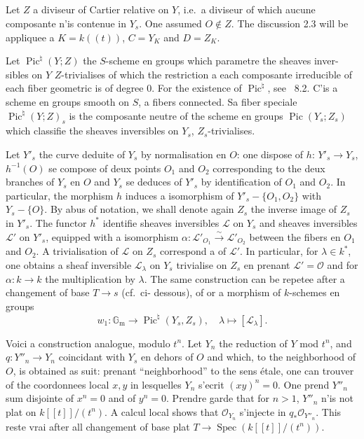 \documentclass[12pt,a4paper]{article}
\theoremstyle{plain}
\theoremstyle{definition}
\theoremstyle{remark}
\DeclareMathOperator{\Spec}{Spec}
\DeclareMathOperator{\Pic}{Pic}
\newcommand{\OO}{\mathcal{O}}
\newcommand{\Gm}{\mathbb{G}_{\mathrm{m}}}
\providecommand{\Gm}{\mathbb{G}_{\mathrm m}}
\providecommand{\Spec}{\operatorname{Spec}}
\begin{document}
\subsection{}

Let $Z$ a diviseur of Cartier relative on $Y$, i.e.\ a diviseur of which aucune
composante n'is contenue in $Y_s$. One assumed $O\notin Z$. The discussion 2.3
will be appliquee a $K=k((t))$, $C=Y_K$ and $D=Z_K$.

Let $\Pic^\natural(Y;Z)$ the $S$-scheme en groups which parametre the sheaves inver-
sibles on $Y$ $Z$-trivialises of which the restriction a each composante irreducible
of each fiber geometric is of degree $0$. For the existence of $\Pic^\natural$, see
\cite{Raynaud1}~8.2. C'is a scheme en groups smooth on $S$, a fibers connected.
Sa fiber speciale $\Pic^\natural(Y;Z)_s$ is the composante neutre of the scheme en groups
$\Pic(Y_s;Z_s)$ which classifie the sheaves inversibles on $Y_s$, $Z_s$-trivialises.

Let $Y'_s$ the curve deduite of $Y_s$ by normalisation en $O$: one dispose of $h$:
$Y'_s\to Y_s$, $h^{-1}(O)$ se compose of deux points $O_1$ and $O_2$ corresponding to the deux
branches of $Y_s$ en $O$ and $Y_s$ se deduces of $Y'_s$ by identification of $O_1$ and $O_2$.
In particular, the morphism $h$ induces a isomorphism of $Y'_s-\{O_1,O_2\}$ with
$Y_s-\{O\}$. By abus of notation, we shall denote again $Z_s$ the inverse image of $Z_s$
in $Y'_s$. The functor $h^*$ identifie sheaves inversibles $\mathscr{L}$ on $Y_s$ and sheaves
inversibles $\mathscr{L}'$ on $Y'_s$, equipped with a isomorphism
$\alpha:\mathscr{L}'_{O_1}\xrightarrow{\sim}\mathscr{L}'_{O_2}$ between the fibers en $O_1$ and $O_2$.
A trivialisation of $\mathscr{L}$ on $Z_s$ correspond a of $\mathscr{L}'$. In particular, for
$\lambda\in k^*$, one obtains a sheaf inversible $\mathscr{L}_\lambda$ on $Y_s$ trivialise on $Z_s$ en
prenant $\mathscr{L}'=\OO$ and for $\alpha:k\to k$ the multiplication by $\lambda$. The same
construction can be repetee after a changement of base $T\to s$ (cf.\ ci-
dessous), of or a morphism of $k$-schemes en groups
\begin{equation}\label{eq:2.4.1}
w_1:\Gm\to\Pic^\natural(Y_s,Z_s),\quad\lambda\mapsto[\mathscr{L}_\lambda].
\end{equation}

Voici a construction analogue, modulo $t^n$. Let $Y_n$ the reduction of $Y$ mod $t^n$,
and $q:Y''_n\to Y_n$ coincidant with $Y_s$ en dehors of $O$ and which, to the neighborhood of $O$, is
obtained as suit: prenant ``neighborhood'' to the sens étale, one can trouver of the
coordonnees local $x,y$ in lesquelles $Y_n$ s'ecrit $(xy)^n=0$. One prend $Y''_n$
sum disjointe of $x^n=0$ and of $y^n=0$. Prendre garde that for $n>1$, $Y''_n$ n'is not plat
on $k[[t]]/(t^n)$. A calcul local shows that $\OO_{Y_n}$ s'injecte in $q_*\OO_{Y''_n}$.
This reste vrai after all changement of base plat
$T\to\Spec(k[[t]]/(t^n))$.
\end{document}
